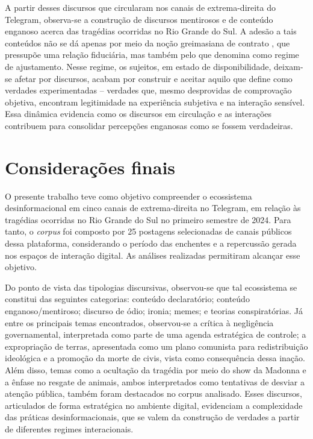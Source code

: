 \documentclass[portuguese]{textolivre}
\begin{document}
A partir desses discursos que circularam nos canais de extrema-direita do Telegram, observa-se a construção de discursos mentirosos e de conteúdo enganoso acerca das tragédias ocorridas no Rio Grande do Sul. A adesão a tais conteúdos não se dá apenas por meio da noção greimasiana de contrato \cite{greimas2014}, que pressupõe uma relação fiduciária, mas também pelo que \textcite{landowski2014} denomina como regime de ajustamento. Nesse regime, os sujeitos, em estado de disponibilidade, deixam-se afetar por discursos, acabam por construir e aceitar aquilo que \textcite{landowski2022} define como verdades experimentadas -- verdades que, mesmo desprovidas de comprovação objetiva, encontram legitimidade na experiência subjetiva e na interação sensível. Essa dinâmica evidencia como os discursos em circulação e as interações contribuem para consolidar percepções enganosas como se fossem verdadeiras.

\section{Considerações finais}\label{sec-conclusao}
O presente trabalho teve como objetivo compreender o ecossistema desinformacional em cinco canais de extrema-direita no Telegram, em relação às tragédias ocorridas no Rio Grande do Sul no primeiro semestre de 2024. Para tanto, o \textit{corpus} foi composto por 25 postagens selecionadas de canais públicos dessa plataforma, considerando o período das enchentes e a repercussão gerada nos espaços de interação digital. As análises realizadas permitiram alcançar esse objetivo. 

Do ponto de vista das tipologias discursivas, observou-se que tal ecossistema se constitui das seguintes categorias: conteúdo declaratório; conteúdo enganoso/mentiroso; discurso de ódio; ironia; memes; e teorias conspiratórias. Já entre os principais temas encontrados, observou-se a crítica à negligência governamental, interpretada como parte de uma agenda estratégica de controle; a expropriação de terras, apresentada como um plano comunista para redistribuição ideológica e a promoção da morte de civis, vista como consequência dessa inação. Além disso, temas como a ocultação da tragédia por meio do show da Madonna e a ênfase no resgate de animais, ambos interpretados como tentativas de desviar a atenção pública, também foram destacados no corpus analisado. Esses discursos, articulados de forma estratégica no ambiente digital, evidenciam a complexidade das práticas desinformacionais, que se valem da construção de verdades a partir de diferentes regimes interacionais.
\end{document}
